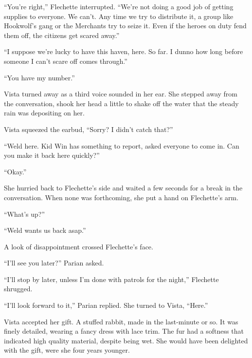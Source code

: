 ``You're right,'' Flechette interrupted.  ``We're not doing a good job of getting supplies to everyone.  We can't.  Any time we try to distribute it, a group like Hookwolf's gang or the Merchants try to seize it.  Even if the heroes on duty fend them off, the citizens get scared away.''



``I suppose we're lucky to have this haven, here.  So far.  I dunno how long before someone I can't scare off comes through.''



``You have my number.''



Vista turned away as a third voice sounded in her ear.  She stepped away from the conversation, shook her head a little to shake off the water that the steady rain was depositing on her.



Vista squeezed the earbud, ``Sorry?  I didn't catch that?''



``Weld here.  Kid Win has something to report, asked everyone to come in.  Can you make it back here quickly?''



``Okay.''



She hurried back to Flechette's side and waited a few seconds for a break in the conversation.  When none was forthcoming, she put a hand on Flechette's arm.



``What's up?''



``Weld wants us back asap.''



A look of disappointment crossed Flechette's face.



``I'll see you later?'' Parian asked.



``I'll stop by later, unless I'm done with patrols for the night,'' Flechette shrugged.



``I'll look forward to it,'' Parian replied. She turned to Vista, ``Here.''



Vista accepted her gift.  A stuffed rabbit, made in the last-minute or so.  It was finely detailed, wearing a fancy dress with lace trim.  The fur had a softness that indicated high quality material, despite being wet.  She would have been delighted with the gift, were she four years younger.



